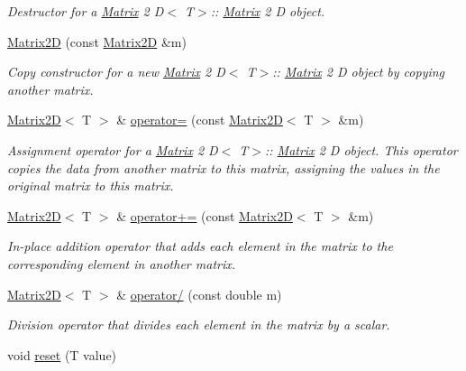 \begin{DoxyCompactItemize}
\begin{DoxyCompactList}\small\item\em Destructor for a \mbox{\hyperlink{classMatrix}{Matrix}} 2 D$<$ T$>$\+:\+: \mbox{\hyperlink{classMatrix}{Matrix}} 2 D object. \end{DoxyCompactList}\item 
\mbox{\hyperlink{classMatrix2D_aa1d3642d7cea07adac1a7bd83586d292}{Matrix2D}} (const \mbox{\hyperlink{classMatrix2D}{Matrix2D}} \&m)
\begin{DoxyCompactList}\small\item\em Copy constructor for a new \mbox{\hyperlink{classMatrix}{Matrix}} 2 D$<$ T$>$\+:\+: \mbox{\hyperlink{classMatrix}{Matrix}} 2 D object by copying another matrix. \end{DoxyCompactList}\item 
\mbox{\hyperlink{classMatrix2D}{Matrix2D}}$<$ T $>$ \& \mbox{\hyperlink{classMatrix2D_a17597829237784fa6089a23b7accb631}{operator=}} (const \mbox{\hyperlink{classMatrix2D}{Matrix2D}}$<$ T $>$ \&m)
\begin{DoxyCompactList}\small\item\em Assignment operator for a \mbox{\hyperlink{classMatrix}{Matrix}} 2 D$<$ T$>$\+:\+: \mbox{\hyperlink{classMatrix}{Matrix}} 2 D object. This operator copies the data from another matrix to this matrix, assigning the values in the original matrix to this matrix. \end{DoxyCompactList}\item 
\mbox{\hyperlink{classMatrix2D}{Matrix2D}}$<$ T $>$ \& \mbox{\hyperlink{classMatrix2D_a05b92232d9a5e7b76c4d4c1508ae2e12}{operator+=}} (const \mbox{\hyperlink{classMatrix2D}{Matrix2D}}$<$ T $>$ \&m)
\begin{DoxyCompactList}\small\item\em In-\/place addition operator that adds each element in the matrix to the corresponding element in another matrix. \end{DoxyCompactList}\item 
\mbox{\hyperlink{classMatrix2D}{Matrix2D}}$<$ T $>$ \& \mbox{\hyperlink{classMatrix2D_a48122f2fa79bf511d0c4e143dcdb0cf0}{operator/}} (const double m)
\begin{DoxyCompactList}\small\item\em Division operator that divides each element in the matrix by a scalar. \end{DoxyCompactList}\item 
void \mbox{\hyperlink{classMatrix2D_a1a646829a2e9d166e0e47439de633b95}{reset}} (T value)

\end{DoxyCompactItemize}
